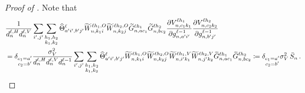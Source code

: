 \begin{proof}[Proof of ]
    Note that
    \begin{align*}
        &\frac{1}{d_{n}^{\ell, H} d_{n}^{\ell, V}}
        \sum_{i', j'}
        \sum_{\substack{h_1, h_2\\ k_1, k_2}}
            \widehat{\Theta}_{
                a' i' , b' j'
            }^{\ell}
            \widetilde{W}_{n , k_1 i}^{\ell h_1 , O}
            \widetilde{W}_{n , k_2 j}^{\ell h_2 , O}
            \widetilde{G}_{n, a c_1}^{\ell h_1}
            \widetilde{G}_{n, b c_2}^{\ell h_2}
            \frac{
                \partial
                V_{n, c_1 k_1}^{\ell h_1}
            }{
                \partial g_{n, a' i'}^{\ell - 1}
            }
            \frac{
                \partial
                V_{n, c_2 k_2}^{\ell h_2}
            }{
                \partial g_{n, b' j'}^{\ell - 1}
            }
        \\
        &=
        \delta_{\substack{c_1 = a' \\ c_2 = b'}}
        \frac{\sigma_{V}^2}{d_{n}^{\ell, H} d_{n}^{\ell, V} d_{n}^{\ell - 1}}
        \sum_{i', j'}
        \sum_{\substack{h_1, h_2\\ k_1, k_2}}
            \widehat{\Theta}_{
                a' i' , b' j'
            }^{\ell}
            \widetilde{W}_{n , k_1 i}^{\ell h_1 , O}
            \widetilde{W}_{n , k_2 j}^{\ell h_2 , O}
            \widetilde{W}_{n, i' k_1}^{\ell h_1, V}
            \widetilde{W}_{n, j' k_2}^{\ell h_2, V}
            \widetilde{G}_{n, a c_1}^{\ell h_1}
            \widetilde{G}_{n, b c_2}^{\ell h_2}
        \coloneqq
        \delta_{\substack{c_1 = a' \\ c_2 = b'}}
        \sigma_{V}^2 \,
        \bar{S}_{n}
        \, .
    \end{align*}

\end{proof}
